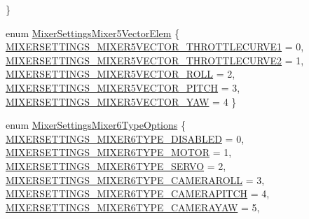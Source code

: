 \begin{DoxyCompactItemize}
 \}
\item 
enum \hyperlink{group___mixer_settings_gaae2b9dca964a82e452bb40db36f6a906}{\-Mixer\-Settings\-Mixer5\-Vector\-Elem} \{ \*
\hyperlink{group___mixer_settings_ggaae2b9dca964a82e452bb40db36f6a906a962623eebeb707fd4c19f28fabbd5952}{\-M\-I\-X\-E\-R\-S\-E\-T\-T\-I\-N\-G\-S\-\_\-\-M\-I\-X\-E\-R5\-V\-E\-C\-T\-O\-R\-\_\-\-T\-H\-R\-O\-T\-T\-L\-E\-C\-U\-R\-V\-E1} = 0, 
\hyperlink{group___mixer_settings_ggaae2b9dca964a82e452bb40db36f6a906a58eb8cec1b78fe7a9f687b7a544092f5}{\-M\-I\-X\-E\-R\-S\-E\-T\-T\-I\-N\-G\-S\-\_\-\-M\-I\-X\-E\-R5\-V\-E\-C\-T\-O\-R\-\_\-\-T\-H\-R\-O\-T\-T\-L\-E\-C\-U\-R\-V\-E2} = 1, 
\hyperlink{group___mixer_settings_ggaae2b9dca964a82e452bb40db36f6a906a0c242aa909cd02948f5f94c7450d795e}{\-M\-I\-X\-E\-R\-S\-E\-T\-T\-I\-N\-G\-S\-\_\-\-M\-I\-X\-E\-R5\-V\-E\-C\-T\-O\-R\-\_\-\-R\-O\-L\-L} = 2, 
\hyperlink{group___mixer_settings_ggaae2b9dca964a82e452bb40db36f6a906a735e25a0d39375ef25b4b55852280a7a}{\-M\-I\-X\-E\-R\-S\-E\-T\-T\-I\-N\-G\-S\-\_\-\-M\-I\-X\-E\-R5\-V\-E\-C\-T\-O\-R\-\_\-\-P\-I\-T\-C\-H} = 3, 
\*
\hyperlink{group___mixer_settings_ggaae2b9dca964a82e452bb40db36f6a906a466893ab7f322f2fbf39d9c45a49cada}{\-M\-I\-X\-E\-R\-S\-E\-T\-T\-I\-N\-G\-S\-\_\-\-M\-I\-X\-E\-R5\-V\-E\-C\-T\-O\-R\-\_\-\-Y\-A\-W} = 4
 \}
\item 
enum \hyperlink{group___mixer_settings_ga827427bb36d4486c782276ec0f3f8699}{\-Mixer\-Settings\-Mixer6\-Type\-Options} \{ \*
\hyperlink{group___mixer_settings_gga827427bb36d4486c782276ec0f3f8699a95948fc172c4fc7718585397e3ce81e2}{\-M\-I\-X\-E\-R\-S\-E\-T\-T\-I\-N\-G\-S\-\_\-\-M\-I\-X\-E\-R6\-T\-Y\-P\-E\-\_\-\-D\-I\-S\-A\-B\-L\-E\-D} = 0, 
\hyperlink{group___mixer_settings_gga827427bb36d4486c782276ec0f3f8699a4bd5c5a49d948c3882e1c22a0785771d}{\-M\-I\-X\-E\-R\-S\-E\-T\-T\-I\-N\-G\-S\-\_\-\-M\-I\-X\-E\-R6\-T\-Y\-P\-E\-\_\-\-M\-O\-T\-O\-R} = 1, 
\hyperlink{group___mixer_settings_gga827427bb36d4486c782276ec0f3f8699aaf16ecf3b4404b963c3aa12f40dd127e}{\-M\-I\-X\-E\-R\-S\-E\-T\-T\-I\-N\-G\-S\-\_\-\-M\-I\-X\-E\-R6\-T\-Y\-P\-E\-\_\-\-S\-E\-R\-V\-O} = 2, 
\hyperlink{group___mixer_settings_gga827427bb36d4486c782276ec0f3f8699a4381d36c173a59878b4325c6c2f5b988}{\-M\-I\-X\-E\-R\-S\-E\-T\-T\-I\-N\-G\-S\-\_\-\-M\-I\-X\-E\-R6\-T\-Y\-P\-E\-\_\-\-C\-A\-M\-E\-R\-A\-R\-O\-L\-L} = 3, 
\*
\hyperlink{group___mixer_settings_gga827427bb36d4486c782276ec0f3f8699ad3a83bd7dcf7124a41b3f245547907c7}{\-M\-I\-X\-E\-R\-S\-E\-T\-T\-I\-N\-G\-S\-\_\-\-M\-I\-X\-E\-R6\-T\-Y\-P\-E\-\_\-\-C\-A\-M\-E\-R\-A\-P\-I\-T\-C\-H} = 4, 
\hyperlink{group___mixer_settings_gga827427bb36d4486c782276ec0f3f8699aed3e0208f2b95ee475df90a5ce9ce700}{\-M\-I\-X\-E\-R\-S\-E\-T\-T\-I\-N\-G\-S\-\_\-\-M\-I\-X\-E\-R6\-T\-Y\-P\-E\-\_\-\-C\-A\-M\-E\-R\-A\-Y\-A\-W} = 5, 

\end{DoxyCompactItemize}

